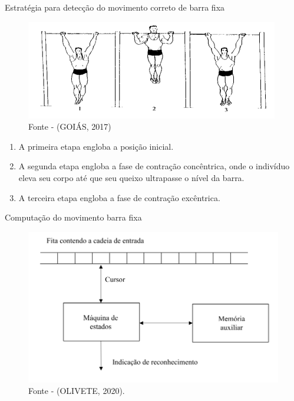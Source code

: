 \begin{frame}{Estratégia para detecção do movimento correto de barra fixa}

    \begin{figure}[!ht]
    \centering
    \includegraphics[scale=0.5]{img/desenvolvimento/barraFixa/barraFixa.jpg}
    \caption*{Fonte - (GOIÁS, 2017)}
    \end{figure}

    
    \begin{enumerate}
        \item  A primeira etapa engloba a posição inicial.

        \item  A segunda etapa engloba a fase de contração concêntrica, onde o indivíduo eleva seu corpo até que seu queixo ultrapasse o nível da barra.

        \item  A terceira etapa engloba a fase de contração excêntrica.
    \end{enumerate}
\end{frame}


\begin{frame}{Computação do movimento barra fixa}

    \begin{figure}[!ht]
    \centering
    \includegraphics[scale=1.3]{img/desenvolvimento/estrategia/reconhecedor.png}
    \caption*{Fonte - (OLIVETE, 2020).}
    \end{figure}
    
\end{frame}


